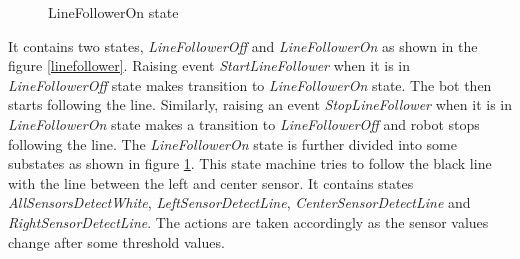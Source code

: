 \documentclass[a4paper,12pt,oneside]{book}
\begin{document}
\begin{itemize}
\begin{figure}[!htbp]
\begin{minipage}{0.45\textwidth}
	\caption{LineFollowerOn state}
	\label{linefollower_on}
\end{minipage}
\end{figure}
It contains two states, \textit{LineFollowerOff} and \textit{LineFollowerOn} as shown in the figure \ref{linefollower}. Raising event \textit{StartLineFollower} when it is in \textit{LineFollowerOff} state makes transition to \textit{LineFollowerOn} state. 
The bot then starts following the line. Similarly, raising an event \textit{StopLineFollower} when it is in \textit{LineFollowerOn} state makes a transition to \textit{LineFollowerOff} and robot stops following the line.
The \textit{LineFollowerOn} state is further divided into some substates as shown in figure \ref{linefollower_on}. This state machine tries to follow the black line with the line between the left and center sensor. It contains states \textit{AllSensorsDetectWhite}, \textit{LeftSensorDetectLine}, \textit{CenterSensorDetectLine} and \textit{RightSensorDetectLine}. The actions are taken accordingly as the sensor values change after some threshold values.


\end{itemize}
\end{document}
